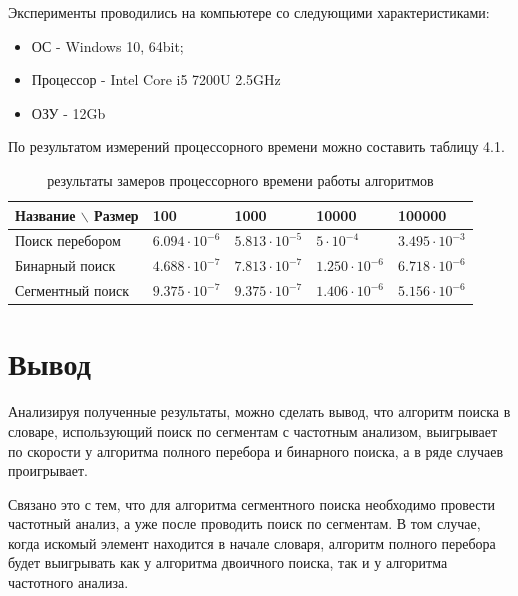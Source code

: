 \documentclass[12pt,a4paper]{report}
\begin{document}
Эксперименты проводились на компьютере со следующими характеристиками:
\begin{itemize}
    \item ОС - Windows 10, 64bit;
    \item Процессор - Intel Core i5 7200U 2.5GHz
    \item ОЗУ - 12Gb
\end{itemize}

По результатом измерений процессорного времени можно составить таблицу 4.1.

\begin{table}[h!]
\caption{результаты замеров процессорного времени работы алгоритмов}
\label{tabular:timesandtenses}
\begin{center}
\begin{tabular}{ | l | l | l | l | l | }
\hline
    Название $\backslash$ Размер & 100                   & 1000                  & 10000                 & 100000                \\ \hline
    Поиск перебором  & $6.094 \cdot 10^{-6}$ & $5.813 \cdot 10^{-5}$ & $5 \cdot 10^{-4}$     & $3.495 \cdot 10^{-3}$ \\ \hline
    Бинарный поиск   & $4.688 \cdot 10^{-7}$ & $7.813 \cdot 10^{-7}$ & $1.250 \cdot 10^{-6}$ & $6.718 \cdot 10^{-6}$ \\ \hline
    Сегментный поиск & $9.375 \cdot 10^{-7}$ & $9.375 \cdot 10^{-7}$ & $1.406 \cdot 10^{-6}$ & $5.156 \cdot 10^{-6}$ \\ \hline
\end{tabular}
\end{center}
\end{table}

\section{Вывод}

Анализируя полученные результаты, можно сделать вывод, что алгоритм поиска в словаре, использующий поиск 
по сегментам с частотным анализом, выигрывает по скорости у алгоритма полного перебора и бинарного поиска, 
а в ряде случаев проигрывает.

Связано это с тем, что для алгоритма сегментного поиска необходимо провести частотный анализ, а уже после 
проводить поиск по сегментам. 
В том случае, когда искомый элемент находится в начале словаря, алгоритм полного перебора будет выигрывать 
как у алгоритма двоичного поиска, так и у алгоритма частотного анализа.
\end{document}
